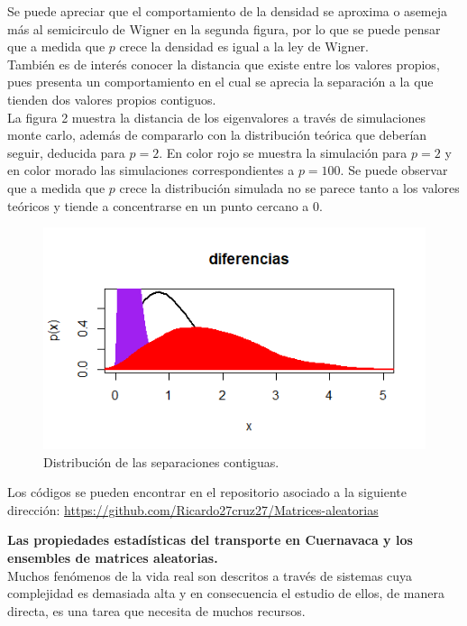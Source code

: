 \documentclass[paper=letter, fontsize=14pt]{scrartcl}
\numberwithin{equation}{section} %
\numberwithin{figure}{section} %
\numberwithin{table}{section} %
\begin{document}
Se puede apreciar que el comportamiento de la densidad se aproxima o asemeja más al semicirculo de Wigner en la segunda figura, por lo que se puede pensar que a medida que $p$ crece la densidad es igual a la ley de Wigner.\\

También es de interés conocer la distancia que existe entre los valores propios, pues presenta un comportamiento en el cual se aprecia la separación a la que tienden dos valores propios contiguos.\\

La figura 2 muestra la distancia de los eigenvalores a través de simulaciones monte carlo, además de compararlo con la distribución teórica que deberían seguir, deducida para $p=2$. En color rojo se muestra la simulación para $p=2$ y en color morado las simulaciones correspondientes a $p=100$. Se puede observar que a medida que $p$ crece la distribución simulada no se parece tanto a los valores teóricos y tiende a concentrarse en un punto cercano a 0.

\begin{figure}[h]
\includegraphics[scale=1]{i3.png} 
\caption{Distribución de las separaciones contiguas.}
\end{figure}

Los códigos se pueden encontrar en el repositorio asociado a la siguiente dirección: \url{https://github.com/Ricardo27cruz27/Matrices-aleatorias}

\pagebreak

\textbf{Las propiedades estadísticas del transporte en Cuernavaca y los ensembles de matrices aleatorias.}\\

Muchos fenómenos de la vida real son descritos a través de sistemas cuya complejidad es demasiada alta y en consecuencia el estudio de ellos, de manera directa, es una tarea que necesita de muchos recursos.\\
\end{document}
